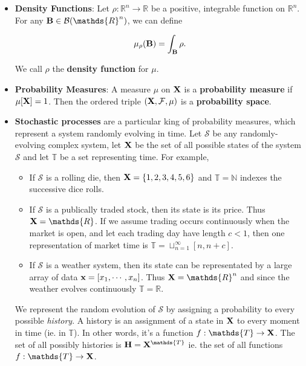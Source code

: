 \documentclass{homework}
\begin{document}
\begin{itemize}
    \item \textbf{Density Functions}: Let $\rho : \mathds{R}^n \rightarrow \mathds{R}$ be a positive, integrable function on $\mathds{R}^n$. For any ${\bf B} \in \mathcal{B}(\mathds{R}^n)$, we can define 
    
    $$
    \mu_{\rho}({\bf B}) = \int_{{\bf B}} \rho.
    $$
    
    We call $\rho$ the \textbf{density function} for $\mu$. \\
    
    \item \textbf{Probability Measures}: A measure $\mu$ on ${\bf X}$ is a \textbf{probability measure} if $\mu[{\bf X}] = 1$. Then the ordered triple $({\bf X}, \mathcal{F}, \mu)$ is a \textbf{probability space}.\\
    
    \item \textbf{Stochastic processes} are a particular king of probability measures, which represent a system randomly evolving in time. Let $\mathcal{S}$ be any  randomly-evolving complex system, let ${\bf X}$ be the set of all possible states of the system $\mathcal{S}$ and let $\mathds{T}$ be a set representing time. For example, 
    
    \begin{itemize}
        \item If $\mathcal{S}$ is a rolling die, then ${\bf X}= \{1,2,3,4,5,6\}$ and $\mathds{T}=\mathds{N} $ indexes the successive dice rolls. \\
        \item If $\mathcal{S}$ is a publically traded stock, then its state is its price. Thus ${\bf X} = \mathds{R}$. If we assume trading occurs continuously when the market is open, and let each trading day have length $c < 1$, then one representation of market time is $\mathds{T} = \sqcup_{n=1}^{\infty} [n, n+c]$. \\
        \item If $\mathcal{S}$ is a weather system, then its state can be representated by a large array of data ${\bf x} = [x_1,\cdots,x_n]$. Thus ${\bf X} = \mathds{R}^n$ and since the weather evolves continuously $\mathds{T}= \mathds{R}$.\\
    \end{itemize}
    
    We represent the random evolution of $\mathcal{S}$ by assigning a probability to every possible \textit{history}. A history is an assignment of a state in ${\bf X}$ to every moment in time (ie. in $\mathds{T}$). In other words, it's a function $f: \mathds{T} \rightarrow {\bf X}$. The set of all possibly histories is ${\bf H} = {\bf X}^{\mathds{T}}$ ie. the set of all functions $f: \mathds{T} \rightarrow {\bf X}$. \\
    

\end{itemize}
\end{document}
